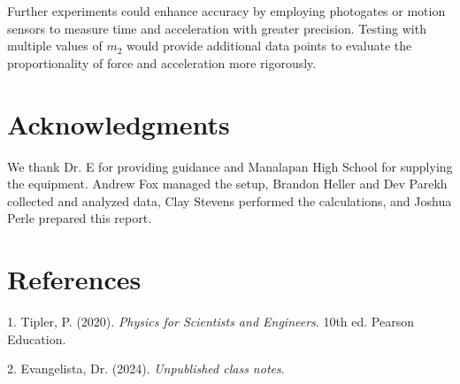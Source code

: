 \documentclass[12pt,twocolumn]{article}
\begin{document}
Further experiments could enhance accuracy by employing photogates or motion sensors to measure time and acceleration with greater precision. Testing with multiple values of \( m_2 \) would provide additional data points to evaluate the proportionality of force and acceleration more rigorously.

\section*{Acknowledgments}
We thank Dr. E for providing guidance and Manalapan High School for supplying the equipment. Andrew Fox managed the setup, Brandon Heller and Dev Parekh collected and analyzed data, Clay Stevens performed the calculations, and Joshua Perle prepared this report.

\section*{References}
1. Tipler, P. (2020). \textit{Physics for Scientists and Engineers}. 10th ed. Pearson Education.

2. Evangelista, Dr. (2024). \textit{Unpublished class notes}.
\end{document}
